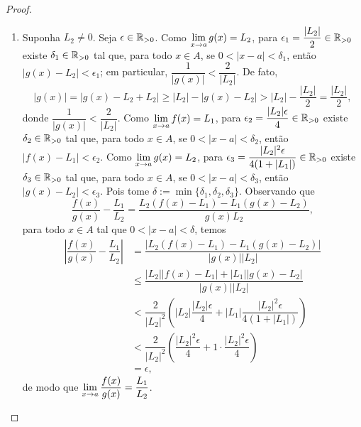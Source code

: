\begin{proof}
\begin{enumerate}[leftmargin=*, align=left, label=\textbf{(\alph*)}]
                \begin{align*}
                    |f(x) g(x) - L_1 L_2|
                        &\leq |f(x)| |g(x) - L_2| + |L_2| |f(x) - L_1| \\
                        &< (1+|L_1|) \dfrac{\epsilon}{2(1+|L_1|)} + |L_2| \dfrac{\epsilon}{2(1+|L_2|)} \\
                        &< \dfrac{\epsilon}{2} + 1 \cdot \dfrac{\epsilon}{2} \\
                        &= \epsilon,
                \end{align*}
            de modo que $\ds \lim_{x \to a} f(x)g(x) = L_1 L_2$. \blackproof
            \item Suponha $L_2 \neq 0$. Seja $\epsilon \in \mathbb{R}_{>0}$. Como $\displaystyle \lim_{x \to a} g(x) = L_2$, para $\displaystyle \epsilon_1 = \dfrac{|L_2|}{2} \in \mathbb{R}_{>0}$ existe $\delta_1 \in \mathbb{R}_{>0}$ tal que, para todo $x \in A$, se $0<|x-a|<\delta_1$, então $|g(x) - L_2| < \epsilon_1$; em particular, $\dfrac{1}{|g(x)|} < \dfrac{2}{|L_2|}$. De fato,
                \[
                    |g(x)| = |g(x) - L_2 + L_2| \geq |L_2| - |g(x) - L_2| > |L_2| - \dfrac{|L_2|}{2} = \dfrac{|L_2|}{2},
                \]
            donde $\dfrac{1}{|g(x)|} < \dfrac{2}{|L_2|}$. Como $\displaystyle \lim_{x \to a} f(x) = L_1$, para $\displaystyle \epsilon_2 = \dfrac{|L_2| \epsilon}{4} \in \mathbb{R}_{>0}$ existe $\delta_2 \in \mathbb{R}_{>0}$ tal que, para todo $x \in A$, se $0<|x-a|<\delta_2$, então $|f(x) - L_1| < \epsilon_2$. Como $\displaystyle \lim_{x \to a} g(x) = L_2$, para $\displaystyle \epsilon_3 = \dfrac{|L_2|^2 \epsilon}{4(1 + |L_1|)} \in \mathbb{R}_{>0}$ existe $\delta_3 \in \mathbb{R}_{>0}$ tal que, para todo $x \in A$, se $0<|x-a|<\delta_3$, então $|g(x) - L_2| < \epsilon_3$. Pois tome $\delta := \min \{\delta_1, \delta_2, \delta_3 \}$. Observando que
                \[
                    \dfrac{f(x)}{g(x)} - \dfrac{L_1}{L_2} = \dfrac{L_2(f(x) - L_1) - L_1(g(x) - L_2)}{g(x)L_2},
                \]
            para todo $x \in A$ tal que $0 < |x-a| < \delta$, temos
                \begin{align*}
                    \left| \dfrac{f(x)}{g(x)} - \dfrac{L_1}{L_2} \right|
                        &= \dfrac{|L_2(f(x) - L_1) - L_1(g(x) - L_2)|}{|g(x)| |L_2|} \\
                        &\leq \dfrac{|L_2| |f(x) - L_1| + |L_1| |g(x) - L_2|}{|g(x)| |L_2|} \\
                        &< \dfrac{2}{|L_2|^2} \left( |L_2| \dfrac{|L_2| \epsilon}{4} + |L_1| \dfrac{|L_2|^2 \epsilon}{4(1 + |L_1|)} \right) \\
                        &< \dfrac{2}{|L_2|^2} \left( \dfrac{|L_2|^2 \epsilon}{4} + 1 \cdot \dfrac{|L_2|^2 \epsilon}{4} \right) \\
                        &= \epsilon,
                \end{align*}
            de modo que $\displaystyle \lim_{x \to a} \dfrac{f(x)}{g(x)} = \dfrac{L_1}{L_2}$. \blackproof
        \end{enumerate}
\end{proof}

